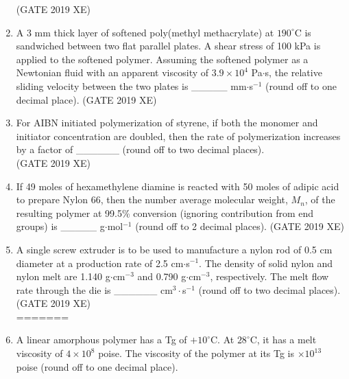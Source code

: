 \documentclass[journal,12pt,onecolumn]{IEEEtran}
\begin{document}
\begin{enumerate}
\hfill{(GATE 2019 XE)} \\


\item A 3 mm thick layer of softened poly(methyl methacrylate) at $190^\circ$C is sandwiched between two flat parallel plates. A shear stress of 100 kPa is applied to the softened polymer. Assuming the softened polymer as a Newtonian fluid with an apparent viscosity of $3.9\times10^{4}$ Pa$\cdot$s, the relative sliding velocity between the two plates is \_\_\_\_\_ mm$\cdot$s$^{-1}$ (round off to one decimal place).
\hfill{(GATE 2019 XE)} \\



\item For AIBN initiated polymerization of styrene, if both the monomer and initiator concentration are doubled, then the rate of polymerization increases by a factor of \_\_\_\_\_\_ (round off to two decimal places).\\
\hfill{(GATE 2019 XE)} \\


\item If 49 moles of hexamethylene diamine is reacted with 50 moles of adipic acid to prepare Nylon 66, then the number average molecular weight, $M_{n}$, of the resulting polymer at 99.5\% conversion (ignoring contribution from end groups) is \_\_\_\_\_ g$\cdot$mol$^{-1}$ (round off to 2 decimal places).
\hfill{(GATE 2019 XE)} \\

\newpage

\item A single screw extruder is to be used to manufacture a nylon rod of 0.5 cm diameter at a production rate of 2.5 cm$\cdot$s$^{-1}$. The density of solid nylon and nylon melt are 1.140 g$\cdot$cm$^{-3}$ and 0.790 g$\cdot$cm$^{-3}$, respectively. The melt flow rate through the die is \_\_\_\_\_\_ cm$^{3}\cdot$s$^{-1}$ (round off to two decimal places).\\
\hfill{(GATE 2019 XE)} \\


=======

\vspace{0.5cm}

\item A linear amorphous polymer has a Tg of $+10^\circ$C. At $28^\circ$C, it has a melt viscosity of $4\times10^{8}$ poise. The viscosity of the polymer at its Tg is \underline{\hspace{2cm}}$\times10^{13}$ poise (round off to one decimal place).
\vspace{0.05cm}
\hfill{} \\


\end{enumerate}
\end{document}
